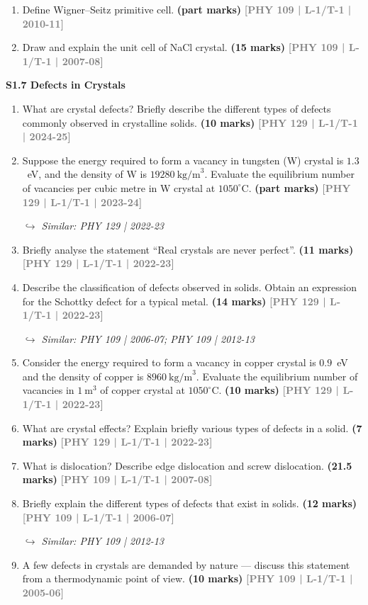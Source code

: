 \documentclass[12pt,a3paper]{article}
\newcommand{\yr}[1]{\hfill\textcolor{gray}{\small\textbf{[#1]}}}
\newcommand{\mk}[1]{\textcolor{orange!70!black}{\small\textbf{(#1 marks)}}}
\newcommand{\variant}[1]{\par\vspace{1pt}\textcolor{blue!50!black}%
  {\footnotesize\textit{$\hookrightarrow$ Similar: #1}}}
\newcommand{\subtopic}[2]{%
  \vspace{10pt}
  \noindent\begin{tcolorbox}[colback=#1!8,colframe=#1,boxrule=0.6pt,arc=4pt,
    left=6pt,right=6pt,top=4pt,bottom=4pt]
    \small\bfseries\textcolor{#1}{#2}
  \end{tcolorbox}
  \vspace{2pt}
}
\begin{document}
\begin{enumerate}

\item Define Wigner--Seitz primitive cell.
\mk{part} \yr{PHY 109 | L-1/T-1 | 2010-11}

\item Draw and explain the unit cell of NaCl crystal.
\mk{15} \yr{PHY 109 | L-1/T-1 | 2007-08}

\end{enumerate}

\label{sec:s17}
\subtopic{cA}{S1.7 \quad Defects in Crystals}

\begin{enumerate}

\item What are crystal defects? Briefly describe the different types of defects commonly observed in crystalline solids.
\mk{10} \yr{PHY 129 | L-1/T-1 | 2024-25}


\item Suppose the energy required to form a vacancy in tungsten (W) crystal is $1.3$~eV, and the density of W is $19280\ \text{kg/m}^3$. Evaluate the equilibrium number of vacancies per cubic metre in W crystal at $1050^\circ$C.
\mk{part} \yr{PHY 129 | L-1/T-1 | 2023-24}
\variant{PHY 129 | 2022-23}

\item Briefly analyse the statement ``Real crystals are never perfect''.
\mk{11} \yr{PHY 129 | L-1/T-1 | 2022-23}

\item Describe the classification of defects observed in solids. Obtain an expression for the Schottky defect for a typical metal.
\mk{14} \yr{PHY 129 | L-1/T-1 | 2022-23}
\variant{PHY 109 | 2006-07; PHY 109 | 2012-13}

\item Consider the energy required to form a vacancy in copper crystal is $0.9$~eV and the density of copper is $8960\ \text{kg/m}^3$. Evaluate the equilibrium number of vacancies in $1\ \text{m}^3$ of copper crystal at $1050^\circ$C.
\mk{10} \yr{PHY 129 | L-1/T-1 | 2022-23}

\item What are crystal effects? Explain briefly various types of defects in a solid.
\mk{7} \yr{PHY 129 | L-1/T-1 | 2022-23} 

\item What is dislocation? Describe edge dislocation and screw dislocation.
\mk{21.5} \yr{PHY 109 | L-1/T-1 | 2007-08}

\item Briefly explain the different types of defects that exist in solids.
\mk{12} \yr{PHY 109 | L-1/T-1 | 2006-07}
\variant{PHY 109 | 2012-13}

\item A few defects in crystals are demanded by nature --- discuss this statement from a thermodynamic point of view.
\mk{10} \yr{PHY 109 | L-1/T-1 | 2005-06}

\end{enumerate}
\end{document}
